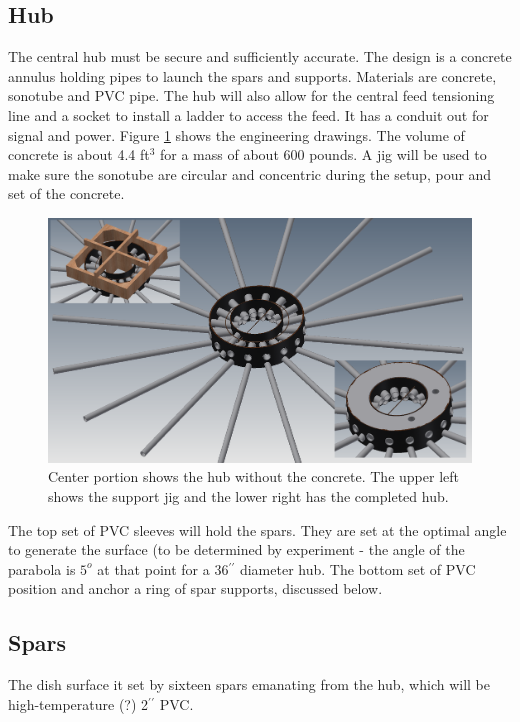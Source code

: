 \documentclass[11pt]{article}
\newcommand{\inch}{$^{\prime\prime}$}
\begin{document}
\subsection{Hub}
The central hub must be secure and sufficiently accurate.  The design is a concrete annulus holding pipes to launch the spars and supports.  Materials are concrete, sonotube and PVC pipe. The hub will also allow for the central feed tensioning line and a socket to install a ladder to access the feed.  It has a conduit out for signal and power.  Figure \ref{fig:hub} shows the engineering drawings.  The volume of concrete is about 4.4 ft$^3$ for a mass of about 600 pounds.
A jig will be used to make sure the sonotube are circular and concentric during the setup, pour and set of the concrete.

\begin{figure}[H]
\centering
\includegraphics[width=\textwidth]{plots/hub.png}
\caption{Center portion shows the hub without the concrete.  The upper left shows the support jig and the lower right has the completed hub.}
\label{fig:hub}
\end{figure}

The top set of PVC sleeves will hold the spars.  They are set at the optimal angle to generate the surface (to be determined by experiment - the angle of the parabola is $5^o$ at that point for a 36\inch{} diameter hub.  The bottom set of PVC position and anchor a ring of spar supports, discussed below.

\subsection{Spars}
The dish surface it set by sixteen spars emanating from the hub, which will be high-temperature (?) 2\inch{} PVC. 
\end{document}
